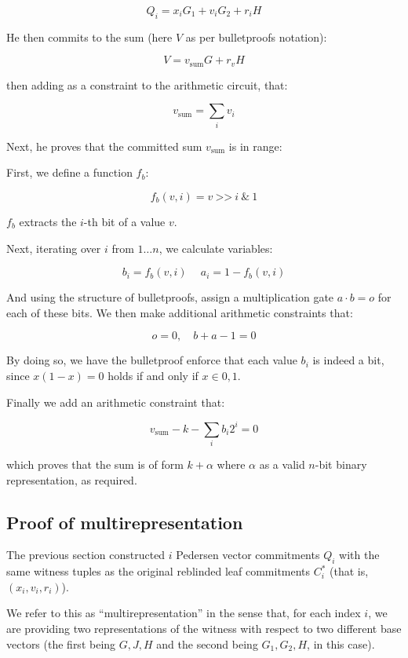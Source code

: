 \documentclass[10pt,a4paper]{article}
\begin{document}
$$Q_i = x_i G_1 + v_i G_2 + r_i H$$

He then commits to the sum (here $V$ as per bulletproofs notation):

$$ V = v_{\textrm{sum}} G + r_v H$$

then adding as a constraint to the arithmetic circuit, that:

$$ v_{\textrm{sum}} = \sum_i v_i $$

Next, he proves that the committed sum $v_{\textrm{sum}}$ is in range:

First, we define a function $f_b$:

$$ f_b(v, i) = v\ \texttt{>>}\ i \ \texttt{\&}\ 1$$

$f_b$ extracts the $i$-th bit of a value $v$.

Next, iterating over $i$ from $1 \ldots n$, we calculate  variables:

$$b_i = f_b(v, i)\ \quad a_i = 1 - f_b(v, i)$$

And using the structure of bulletproofs, assign a multiplication gate $a \cdot b = o$ for each of these bits. We then make additional arithmetic constraints that:

$$ o=0, \quad b+a-1=0 $$

By doing so, we have the bulletproof enforce that each value $b_i$ is indeed a bit, since $x(1-x)=0$ holds if and only if $x \in {0,1}$.

\vspace{5 pt}

Finally we add an arithmetic constraint that:

$$v_{\textrm{sum}} - k - \sum_i b_i 2^i = 0$$

which proves that the sum is of form $k+\alpha$ where $\alpha$ as a valid $n$-bit binary representation, as required.

\subsection{Proof of multirepresentation}

The previous section constructed $i$ Pedersen vector commitments $Q_i$ with the same witness tuples as the original reblinded leaf commitments $C_i^*$ (that is, $(x_i, v_i, r_i)$).

We refer to this as ``multirepresentation'' in the sense that, for each index $i$, we are providing two representations of the witness with respect to two different base vectors (the first being $G, J, H$ and the second being $G_1, G_2, H$, in this case).
\end{document}
